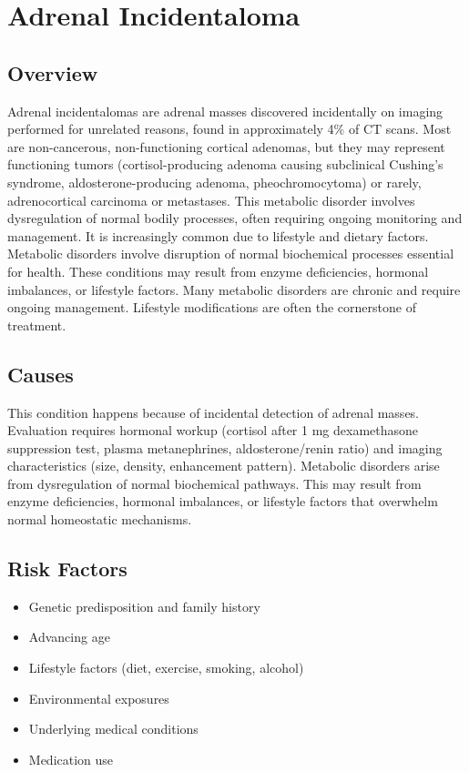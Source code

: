 \chapter{Adrenal Incidentaloma}
\label{sec:Adrenal Incidentaloma}

\section{Overview}
Adrenal incidentalomas are adrenal masses discovered incidentally on imaging performed for unrelated reasons, found in approximately 4\% of CT scans. Most are non-cancerous, non-functioning cortical adenomas, but they may represent functioning tumors (cortisol-producing adenoma causing subclinical Cushing's syndrome, aldosterone-producing adenoma, pheochromocytoma) or rarely, adrenocortical carcinoma or metastases. This metabolic disorder involves dysregulation of normal bodily processes, often requiring ongoing monitoring and management. It is increasingly common due to lifestyle and dietary factors. Metabolic disorders involve disruption of normal biochemical processes essential for health. These conditions may result from enzyme deficiencies, hormonal imbalances, or lifestyle factors. Many metabolic disorders are chronic and require ongoing management. Lifestyle modifications are often the cornerstone of treatment.
\section{Causes}
This condition happens because of incidental detection of adrenal masses. Evaluation requires hormonal workup (cortisol after 1 mg dexamethasone suppression test, plasma metanephrines, aldosterone/renin ratio) and imaging characteristics (size, density, enhancement pattern). Metabolic disorders arise from dysregulation of normal biochemical pathways. This may result from enzyme deficiencies, hormonal imbalances, or lifestyle factors that overwhelm normal homeostatic mechanisms.   
\section{Risk Factors}
\begin{itemize}[noitemsep]
  \item Genetic predisposition and family history
  \item Advancing age
  \item Lifestyle factors (diet, exercise, smoking, alcohol)
  \item Environmental exposures
  \item Underlying medical conditions
  \item Medication use
\end{itemize}
